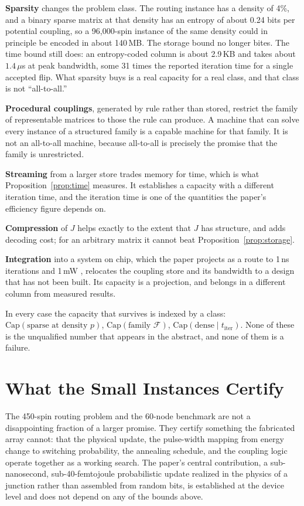 \documentclass[11pt]{article}
\theoremstyle{definition}
\theoremstyle{remark}
\begin{document}
\textbf{Sparsity} changes the problem class. The routing instance has a density of 4\%, and a binary sparse matrix at that density has an entropy of about 0.24 bits per potential coupling, so a 96,000-spin instance of the same density could in principle be encoded in about 140\,MB. The storage bound no longer bites. The time bound still does: an entropy-coded column is about 2.9\,KB and takes about $1.4\,\mu$s at peak bandwidth, some 31 times the reported iteration time for a single accepted flip. What sparsity buys is a real capacity for a real class, and that class is not ``all-to-all.''

\textbf{Procedural couplings}, generated by rule rather than stored, restrict the family of representable matrices to those the rule can produce. A machine that can solve every instance of a structured family is a capable machine for that family. It is not an all-to-all machine, because all-to-all is precisely the promise that the family is unrestricted.

\textbf{Streaming} from a larger store trades memory for time, which is what Proposition~\ref{prop:time} measures. It establishes a capacity with a different iteration time, and the iteration time is one of the quantities the paper's efficiency figure depends on.

\textbf{Compression} of $J$ helps exactly to the extent that $J$ has structure, and adds decoding cost; for an arbitrary matrix it cannot beat Proposition~\ref{prop:storage}.

\textbf{Integration} into a system on chip, which the paper projects as a route to 1\,ns iterations and 1\,mW \cite{li2026}, relocates the coupling store and its bandwidth to a design that has not been built. Its capacity is a projection, and belongs in a different column from measured results.

In every case the capacity that survives is indexed by a class: $\mathrm{Cap}(\text{sparse at density } p)$, $\mathrm{Cap}(\text{family } \mathcal{F})$, $\mathrm{Cap}(\text{dense} \mid t_{\mathrm{iter}})$. None of these is the unqualified number that appears in the abstract, and none of them is a failure.

\section{What the Small Instances Certify}

The 450-spin routing problem and the 60-node benchmark are not a disappointing fraction of a larger promise. They certify something the fabricated array cannot: that the physical update, the pulse-width mapping from energy change to switching probability, the annealing schedule, and the coupling logic operate together as a working search. The paper's central contribution, a sub-nanosecond, sub-40-femtojoule probabilistic update realized in the physics of a junction rather than assembled from random bits, is established at the device level and does not depend on any of the bounds above.
\end{document}
